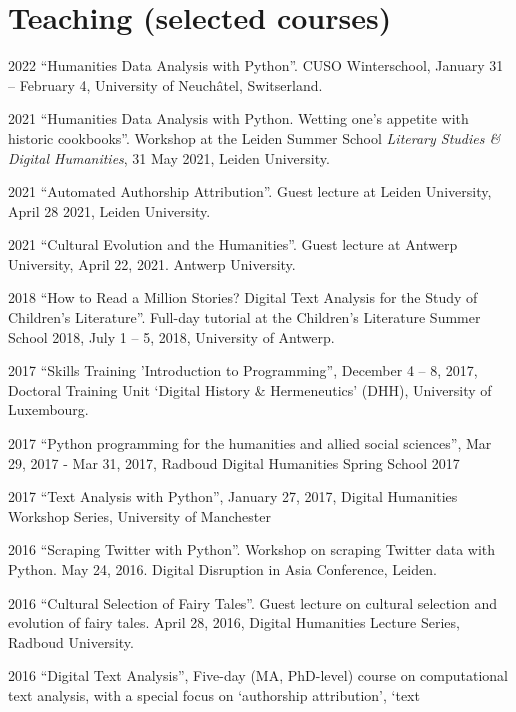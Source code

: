\documentclass[12pt,letterpaper]{report}
\begin{document}
\section*{Teaching (selected courses)}
\begin{tablist}
  \item[2022] \tab{}``Humanities Data Analysis with Python''. CUSO Winterschool, January 31 
    -- February 4, University of Neuchâtel, Switserland. 
  \item[2021] \tab{}``Humanities Data Analysis with Python. Wetting one’s appetite with
    historic cookbooks''. Workshop at the Leiden Summer School \textit{Literary Studies \&
      Digital Humanities}, 31 May 2021, Leiden University.
  \item[2021] \tab{}``Automated Authorship Attribution''. Guest lecture at Leiden
    University, April 28 2021, Leiden University.     
  \item[2021] \tab{}``Cultural Evolution and the Humanities''. Guest lecture at Antwerp
    University, April 22, 2021. Antwerp University. 
  \item[2018] \tab{}``How to Read a Million Stories? Digital Text Analysis for the Study of
    Children's Literature''. Full-day tutorial at the Children’s Literature Summer School
    2018, July 1 -- 5, 2018, University of Antwerp.  
  \item[2017] \tab{}``Skills Training ’Introduction to Programming'', December 4 -- 8,
    2017, Doctoral Training Unit `Digital History \& Hermeneutics' (DHH), University of
    Luxembourg. 
  \item[2017] \tab{}``Python programming for the humanities and allied social sciences'',
    Mar 29, 2017 - Mar 31, 2017, Radboud Digital Humanities Spring School 2017
  \item[2017] \tab{}``Text Analysis with Python'', January 27, 2017, Digital Humanities
    Workshop Series, University of Manchester
  \item[2016] \tab{}``Scraping Twitter with Python''. Workshop on scraping Twitter data
    with Python. May 24, 2016. Digital Disruption in Asia Conference, Leiden. 
  \item[2016] \tab{}``Cultural Selection of Fairy Tales''. Guest lecture on cultural
    selection and evolution of fairy tales. April 28, 2016, Digital Humanities Lecture
    Series, Radboud University. 
  \item[2016] \tab{}``Digital Text Analysis'', Five-day (MA, PhD-level) course on
    computational text analysis, with a special focus on `authorship attribution', `text

\end{tablist}
\end{document}
